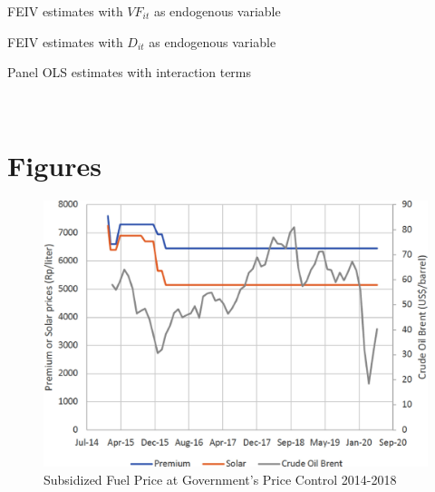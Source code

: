 \documentclass[letterpaper,12pt,leqno]{article}
\begin{document}
\begin{table}[H]
\caption{FEIV estimates with $VF_{it}$ as endogenous variable}
\scalebox{0.8}{}    
\label{t:FEIV1}
\end{table}

\begin{table}[H]
\caption{FEIV estimates with $D_{it}$ as endogenous variable}
\scalebox{0.8}{}    
\label{t:FEIV2}\end{table}


\begin{table}[H]
\caption{Panel OLS estimates with interaction terms} 
\scalebox{0.8}{}
\label{t:pols2}\end{table}
\\
\pagebreak
\section{Figures}

\begin{figure}[h!]
\includegraphics[scale=0.7]{Final_Project/image/bbm-price-2014-2018.jpg}
\caption{Subsidized Fuel Price at Government's Price Control 2014-2018}
\label{f:1}
\end{figure}
\end{document}
